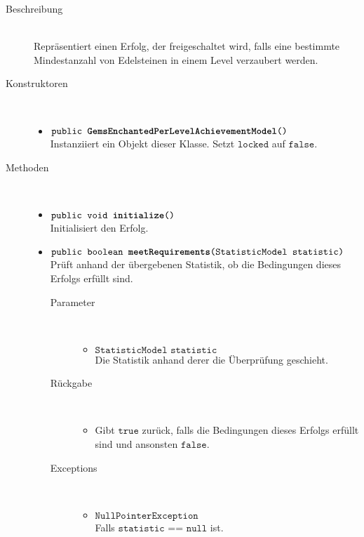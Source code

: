 		\begin{description}
		\item[Beschreibung] \hfill \\ Repräsentiert einen Erfolg, der freigeschaltet wird, falls eine bestimmte Mindestanzahl von Edelsteinen in einem Level verzaubert werden.
			
		\item[Konstruktoren] \hfill \\
			\vspace{-.8cm}
			\begin{itemize}
				\item $\texttt{public \textbf{GemsEnchantedPerLevelAchievementModel}()}$ \\ Instanziiert ein Objekt dieser Klasse. Setzt $\texttt{locked}$ auf $\texttt{false}$.
			\end{itemize}
			
		\item[Methoden] \hfill \\
			\vspace{-.8cm}
			\begin{itemize}
						\item $\texttt{public void \textbf{initialize}()}$ \\ Initialisiert den Erfolg.
				
				\item $\texttt{public boolean \textbf{meetRequirements}(StatisticModel statistic)}$ \\ Prüft anhand der übergebenen Statistik, ob die Bedingungen dieses Erfolgs erfüllt sind.
				\begin{description}
				\item[Parameter] \hfill \\
					\vspace{-.8cm}
					\begin{itemize}
						\item $\texttt{StatisticModel statistic}$ \\ Die Statistik anhand derer die Überprüfung geschieht. 
					\end{itemize}
					\item[Rückgabe] \hfill \\
					\vspace{-.8cm}
					\begin{itemize}
						\item Gibt $\texttt{true}$ zurück, falls die Bedingungen dieses Erfolgs erfüllt sind und ansonsten $\texttt{false}$.
					\end{itemize}
					\item[Exceptions] \hfill \\
					\vspace{-.8cm}
					\begin{itemize}
						\item $\texttt{NullPointerException}$ \\ Falls $\texttt{statistic == null}$ ist.
					\end{itemize}
				\end{description}
			\end{itemize}
		\end{description}
		
